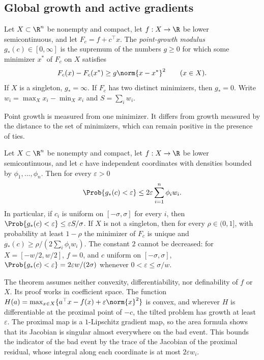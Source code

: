 \subsection{Global growth and active gradients}\label{sec:count:growth}

\begin{definition}\label{def:count:growth}
Let $X\subset\R^n$ be nonempty and compact, let $f:X\to\R$ be lower
semicontinuous, and let $F_c=f+c^\top x$. The \emph{point-growth modulus}
$g_*(c)\in[0,\infty]$ is the supremum of the numbers $g\ge0$ for which some
minimizer $x^*$ of $F_c$ on $X$ satisfies
\[
 F_c(x)-F_c(x^*)\ge g\norm{x-x^*}^2\qquad(x\in X).
\]
If $X$ is a singleton, $g_*=\infty$. If $F_c$ has two distinct minimizers,
then $g_*=0$. Write $w_i=\max_Xx_i-\min_Xx_i$ and $S=\sum_iw_i$.
\end{definition}

Point growth is measured from one minimizer. It differs from growth measured
by the distance to the set of minimizers, which can remain positive in the
presence of ties.

\begin{theorem}\label{thm:count:growth-tail}
Let $X\subset\R^n$ be nonempty and compact, let $f:X\to\R$ be lower
semicontinuous, and let $c$ have independent coordinates with densities
bounded by $\phi_1,\dots,\phi_n$. Then for every $\varepsilon>0$
\[
 \Prob\{g_*(c)<\varepsilon\}\le2\varepsilon\sum_{i=1}^n\phi_iw_i .
\]
In particular, if $c_i$ is uniform on $[-\sigma,\sigma]$ for every $i$, then
$\Prob\{g_*(c)<\varepsilon\}\le\varepsilon S/\sigma$. If $X$ is not a
singleton, then for every $\rho\in(0,1]$, with probability at least
$1-\rho$ the minimizer of $F_c$ is unique and
$g_*(c)\ge\rho/(2\sum_i\phi_iw_i)$. The constant $2$ cannot be decreased:
for $X=[-w/2,w/2]$, $f=0$, and $c$ uniform on $[-\sigma,\sigma]$,
$\Prob\{g_*(c)<\varepsilon\}=2\varepsilon w/(2\sigma)$ whenever
$0<\varepsilon\le\sigma/w$.
\end{theorem}

The theorem assumes neither convexity, differentiability, nor definability of
$f$ or $X$. Its proof works in coefficient space. The function
$H(a)=\max_{x\in X}\{a^\top x-f(x)+\varepsilon\norm{x}^2\}$ is convex, and
wherever $H$ is differentiable at the proximal point of $-c$, the tilted
problem has growth at least $\varepsilon$. The proximal map is a
$1$-Lipschitz gradient map, so the area formula shows that its Jacobian is
singular almost everywhere on the bad event. This bounds the indicator of
the bad event by the trace of the Jacobian of the proximal residual, whose
integral along each coordinate is at most $2\varepsilon w_i$.

